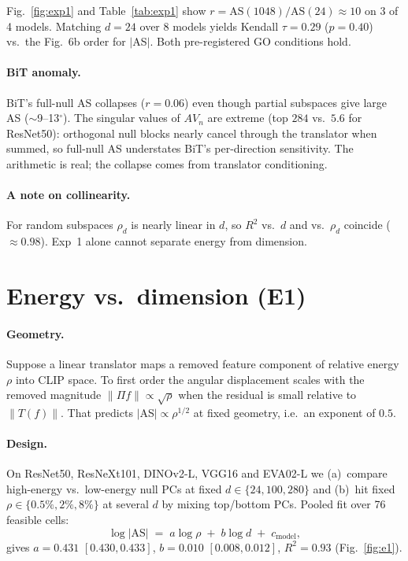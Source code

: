 \documentclass[10pt,twocolumn]{article}
\begin{document}
Fig.~\ref{fig:exp1} and Table~\ref{tab:exp1} show $r{=}\mathrm{AS}(1048)/\mathrm{AS}(24)\approx10$ on 3 of 4 models.
Matching $d{=}24$ over 8 models yields Kendall $\tau{=}0.29$ ($p{=}0.40$) vs.\ the Fig.~6b order for $|$AS$|$.
Both pre-registered GO conditions hold.

\paragraph{BiT anomaly.}
BiT's full-null AS collapses ($r{=}0.06$) even though partial subspaces give large AS ($\sim$9--13$^\circ$).
The singular values of $A V_n$ are extreme (top $284$ vs.\ $5.6$ for ResNet50): orthogonal null blocks nearly cancel through the translator when summed, so full-null AS understates BiT's per-direction sensitivity.
The arithmetic is real; the collapse comes from translator conditioning.

\paragraph{A note on collinearity.}
For random subspaces $\rho_d$ is nearly linear in $d$, so $R^2$ vs.\ $d$ and vs.\ $\rho_d$ coincide ($\approx0.98$).
Exp~1 alone cannot separate energy from dimension.

\section{Energy vs.\ dimension (E1)}
\vspace{-0.2em}
\paragraph{Geometry.}
Suppose a linear translator maps a removed feature component of relative energy $\rho$ into CLIP space. To first order the angular displacement scales with the removed magnitude $\|\Pi f\|\propto\sqrt{\rho}$ when the residual is small relative to $\|T(f)\|$.
That predicts $|$AS$|\propto\rho^{1/2}$ at fixed geometry, i.e.\ an exponent of $0.5$.

\paragraph{Design.}
On ResNet50, ResNeXt101, DINOv2-L, VGG16 and EVA02-L we (a)~compare high-energy vs.\ low-energy null PCs at fixed $d\in\{24,100,280\}$ and (b)~hit fixed $\rho\in\{0.5\%,2\%,8\%\}$ at several $d$ by mixing top/bottom PCs.
Pooled fit over 76 feasible cells:
\[
\log|\mathrm{AS}| \;=\; a\log\rho \;+\; b\log d \;+\; c_{\mathrm{model}},
\]
gives $a{=}0.431$ $[0.430,0.433]$, $b{=}0.010$ $[0.008,0.012]$, $R^2{=}0.93$ (Fig.~\ref{fig:e1}).
\end{document}
